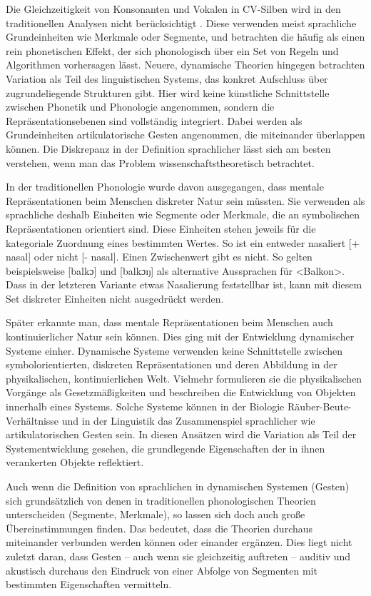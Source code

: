 Die Gleichzeitigkeit von Konsonanten und Vokalen in CV-Silben wird in den traditionellen Analysen nicht berücksichtigt \citep{Mücke2016}. Diese verwenden meist sprachliche Grundeinheiten wie Merkmale oder Segmente, und betrachten die  häufig als einen rein phonetischen Effekt, der sich phonologisch über ein Set von Regeln und Algorithmen vorhersagen lässt. Neuere, dynamische Theorien hingegen betrachten Variation als Teil des linguistischen Systems, das konkret Aufschluss über zugrundeliegende Strukturen gibt. Hier wird keine künstliche Schnittstelle zwischen Phonetik und Phonologie angenommen, sondern die Repräsentationsebenen sind vollständig integriert. Dabei werden als Grundeinheiten artikulatorische Gesten angenommen, die miteinander überlappen können. Die Diskrepanz in der Definition sprachlicher  lässt sich am besten verstehen, wenn man das Problem wissenschaftstheoretisch betrachtet.

\largerpage
In der traditionellen Phonologie wurde davon ausgegangen, dass mentale Repräsentationen beim Menschen diskreter Natur sein müssten. Sie verwenden als sprachliche  deshalb Einheiten wie Segmente oder Merkmale, die an symbolischen Repräsentationen orientiert sind. Diese Einheiten stehen jeweils für die kategoriale Zuordnung eines bestimmten Wertes. So ist ein  entweder nasaliert [+ nasal] oder nicht [- nasal]. Einen Zwischenwert gibt es nicht. So gelten beispielsweise [balkɔ] und [balkɔŋ] als alternative Aussprachen für <Balkon>. Dass in der letzteren Variante etwas Nasalierung feststellbar ist, kann mit diesem Set diskreter Einheiten nicht ausgedrückt werden.

Später erkannte man, dass mentale Repräsentationen beim Menschen auch kontinuierlicher Natur sein können. Dies ging mit der Entwicklung dynamischer Systeme einher. Dynamische Systeme verwenden keine Schnittstelle zwischen symbolorientierten, diskreten Repräsentationen und deren Abbildung in der physikalischen, kontinuierlichen Welt. Vielmehr formulieren sie die physikalischen Vorgänge als Gesetzmäßigkeiten und beschreiben die Entwicklung von Objekten innerhalb eines Systems. Solche Systeme können in der Biologie Räuber-Beute-Verhältnisse und in der Linguistik das Zusammenspiel sprachlicher  wie artikulatorischen Gesten sein. In diesen Ansätzen wird die Variation als Teil der Systementwicklung gesehen, die grundlegende Eigenschaften der in ihnen verankerten Objekte reflektiert.

Auch wenn die Definition von sprachlichen  in dynamischen Systemen (Gesten) sich grundsätzlich von denen in traditionellen phonologischen Theorien unterscheiden (Segmente, Merkmale), so lassen sich doch auch große Übereinstimmungen finden. Das bedeutet, dass die Theorien durchaus miteinander verbunden werden können oder einander ergänzen. Dies liegt nicht zuletzt daran, dass Gesten --  auch wenn sie gleichzeitig auftreten -- auditiv und akustisch durchaus den Eindruck von einer Abfolge von Segmenten mit bestimmten Eigenschaften vermitteln. 

